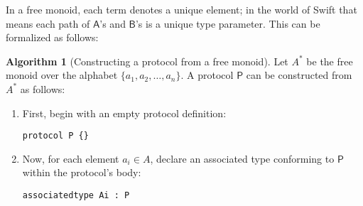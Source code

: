 \documentclass[a4paper,headsepline,bibliography=totoc,toc=flat,fleqn,twoside=semi]{scrbook}
\theoremstyle{definition}
\theoremstyle{definition}
\theoremstyle{definition}
\newtheorem{algorithm}{Algorithm}[chapter]
\newcommand{\namesym}[1]{\mathsf{#1}}
\newcommand{\proto}[1]{\bm{\mathsf{#1}}}
\begin{document}
In a free monoid, each term denotes a unique element; in the world of Swift that means each path of $\namesym{A}$'s and $\namesym{B}$'s is a unique type parameter. This can be formalized as follows:
\begin{algorithm}[Constructing a protocol from a free monoid]\label{freemonoidproto}
Let $A^*$ be the free monoid over the alphabet $\{a_1,a_2,\ldots,a_n\}$. A protocol $\proto{P}$ can be constructed from $A^*$ as follows:
\begin{enumerate}
\item First, begin with an empty protocol definition:
\begin{Verbatim}
protocol P {}
\end{Verbatim}
\item Now, for each element $a_i\in A$, declare an associated type conforming to $\proto{P}$ within the protocol's body:
\begin{Verbatim}
associatedtype Ai : P
\end{Verbatim}
\end{enumerate}
\end{algorithm}
\end{document}
